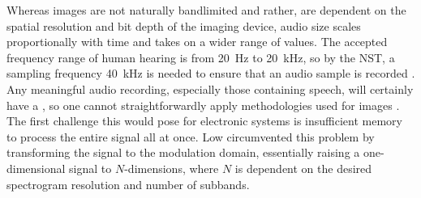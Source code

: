  Whereas images are not naturally bandlimited and rather, are dependent on the spatial resolution and bit depth of the imaging device, audio size scales proportionally with time and takes on a wider range of values. The accepted frequency range of human hearing is from 20~Hz to 20~kHz, so by the NST, a sampling frequency  40~kHz is needed to ensure that an audio sample is recorded . Any meaningful audio recording, especially those containing speech, will certainly have a , so one cannot straightforwardly apply methodologies used for images . The first challenge this would pose for electronic systems is insufficient memory to process the entire signal all at once. Low circumvented this problem \cite{Low2013,Low2018} by transforming the signal to the modulation domain,  essentially raising a one-dimensional signal to $N$-dimensions, where $N$ is dependent on the desired spectrogram resolution and number of subbands. 


